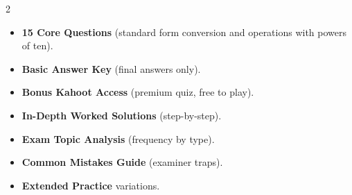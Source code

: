\documentclass[11pt,a4paper]{article}
\newcommand{\FullReleaseDate}{April 30, 2026}
\begin{document}
\vspace{8pt}

\begin{multicols}{2}
  \begin{tcolorbox}[card, title=\sffamily\bfseries\textcolor{white}{\faHandPointDown\ TODAY (Simplified Version)}, colbacktitle=mainblue, boxed title style={sharp corners, boxrule=0pt}]
    \begin{itemize}[leftmargin=1.2em, itemsep=2pt]
      \item \small \textbf{15 Core Questions} (standard form conversion and operations with powers of ten).
      \item \small \textbf{Basic Answer Key} (final answers only).
      \item \small \textbf{Bonus Kahoot Access} (premium quiz, free to play).
    \end{itemize}
  \end{tcolorbox}

  \columnbreak

  \begin{tcolorbox}[card, title=\sffamily\bfseries\textcolor{white}{\faRocket\ ON \FullReleaseDate\ (Full Upgrade)}, colbacktitle=mainblue, boxed title style={sharp corners, boxrule=0pt}]
    \begin{itemize}[leftmargin=1.2em, itemsep=2pt]
      \item \small \textbf{In-Depth Worked Solutions} (step-by-step).
      \item \small \textbf{Exam Topic Analysis} (frequency by type).
      \item \small \textbf{Common Mistakes Guide} (examiner traps).
      \item \small \textbf{Extended Practice} variations.
    \end{itemize}
  \end{tcolorbox}
\end{multicols}
\end{document}
